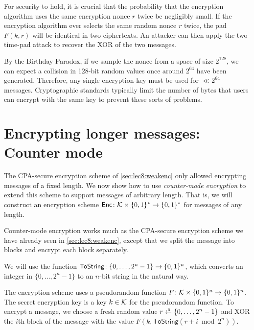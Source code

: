 For security to hold, it is crucial that the probability 
that the encryption algorithm uses the same encryption nonce $r$ twice
be negligibly small.
If the encryption algorithm ever selects the
same random nonce $r$ twice, the pad $F(k, r)$ will be identical in 
two ciphertexts.
An attacker can then apply the two-time-pad attack to recover the XOR of the two messages.

By the Birthday Paradox, if we sample the nonce from a space of size $2^{128}$, we can expect a collision in 128-bit random values once around $2^{64}$ have been generated. Therefore, any single encryption-key must be used for $\ll 2^{64}$ messages.
Cryptographic standards typically limit the number of bytes that users can
encrypt with the same key to prevent these sorts of problems.


\section{Encrypting longer messages: Counter mode}
\label{sec:enc:ctr}

The CPA-secure encryption scheme of \cref{sec:lec8:weakenc} only
allowed encrypting messages of a fixed length.
We now show how to use \emph{counter-mode encryption} to extend
this scheme to support messages of arbitrary length.
That is, we will construct an encryption scheme 
$\mathsf{Enc} \colon \mathcal{K} \times \{0,1\}^* \to \{0,1\}^*$
for messages of any length.

Counter-mode encryption works much as the CPA-secure encryption
scheme we have already seen in \cref{sec:lec8:weakenc}, except 
that we split the message into blocks and encrypt each block separately.

\newcommand{\ToString}{\mathsf{ToString}}
We will use the function $\ToString \colon \{0, \dots, 2^n-1\} \to \zon$,
which converts an integer in $\{0, \dots, 2^n -1\}$ to an $n$-bit string in the natural way.

The encryption scheme uses a pseudorandom function $F \colon \mathcal{K} \times \{0,1\}^n \to \{0,1\}^n$.
The secret encryption key is a key $k \in \mathcal{K}$ for the pseudorandom function.
To encrypt a message, we choose a fresh random value $r \getsr \{0, \dots, 2^n-1\}$ and 
XOR the $i$th block of the message with the value $F(k, \ToString(r+i \bmod 2^n))$.

